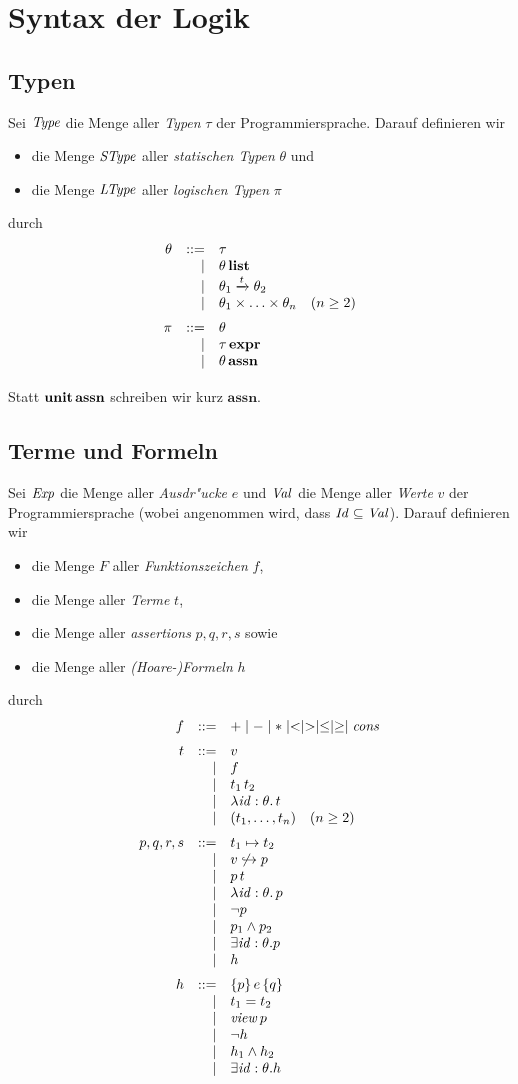 \documentclass[12pt,a4paper,bigheadings]{scrartcl}
\newcommand{\assn}{\ensuremath{\mathbf{assn}}}
\newcommand{\atype}[1]{#1\,\assn}
\newcommand{\bexpr}{\ensuremath{\mathbf{expr}}}
\newcommand{\etype}[1]{#1\,\bexpr}
\newcommand{\Stype}{\name{SType}}
\newcommand{\tto}{\ensuremath{\xrightarrow{t}}}
\renewcommand{\disjoint}[2]{\ensuremath{#2\not\hookrightarrow#1}}
\newcommand{\view}[1]{\ensuremath{\app{\name{view}}{#1}}}
\begin{document}
\section{Syntax der Logik}

\subsection{Typen}

Sei ${\text{\it Type\/}}$ die Menge aller {\em Typen} $\tau$ der Programmiersprache. Darauf definieren wir 
\begin{itemize}
  \item die Menge $\Stype$ aller {\em statischen Typen} $\theta$ und
  \item die Menge ${\text{\it LType\/}}$ aller {\em logischen Typen} $\pi$
\end{itemize}
durch
\[\bgram
\theta  \is \tau
        \al \ltype{\theta}
        \al \theta_1 \tto \theta_2
        \al \theta_1 \times \ldots \times \theta_n \quad (n \ge 2)
        \n
\pi \is \theta
    \al \etype{\tau}
    \al \atype{\theta}
    \n
\egram\]
Statt $\atype{\unit}$ schreiben wir kurz $\assn$.

\subsection{Terme und Formeln}

Sei ${\text{\it Exp\/}}$ die Menge aller {\em Ausdr"ucke} $e$ und ${\text{\it Val\/}}$ die Menge aller {\em Werte} $v$
der Programmiersprache (wobei angenommen wird, dass ${\text{\it Id\/}} \subseteq {\text{\it Val\/}}$). Darauf definieren wir 
\begin{itemize}
  \item die Menge $F$ aller {\em Funktionszeichen} $f$,
  \item die Menge  aller {\em Terme} $t$,
  \item die Menge  aller {\em assertions} $p,q,r,s$ sowie
  \item die Menge  aller {\em (Hoare-)Formeln} $h$
\end{itemize}
durch
\[\bgram
f \is + \mid - \mid * \mid < \mid > \mid \le \mid \ge \mid \Cons
  \n
t \is v
  \al f
  \al \app{t_1}{t_2}
  \al \abstr{\id:\theta}{t}
  \al (t_1,\ldots,t_n)  \quad (n \ge 2)
  \n
p,q,r,s \is t_1 \mapsto t_2
        \al \disjoint{p}{v}
        \al \app{p}{t}
        \al \abstr{\id:\theta}{p}
        \al \neg p
        \al p_1 \wedge p_2
        \al \exists \id:\theta. p
        \al h
        \n
h \is \triple{p}{e}{q}
  \al t_1 = t_2
  \al \view{p}
  \al \neg h
  \al h_1 \wedge h_2
  \al \exists \id:\theta. h
\egram\]
\end{document}

